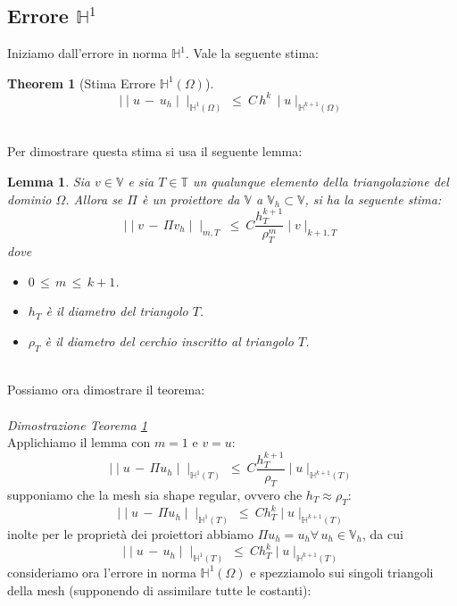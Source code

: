 \documentclass[12pt,a4paper]{report}
\theoremstyle{theorem}
\newtheorem{theorem}{Theorem}[section]
\theoremstyle{theorem}
\newtheorem{lemma}{Lemma}[section]
\theoremstyle{definition}
\begin{document}
\subsection{Errore $\mathbb{H}^{1}$}
Iniziamo dall'errore in norma $\mathbb{H}^{1}$. Vale la seguente stima:
\begin{theorem} [Stima Errore $\mathbb{H}^{1}(\Omega)$] \label{Stima Errore H1} 
\[ \mid \mid u \, - \, u_{h} \mid \mid_{\mathbb{H}^{1}(\Omega)} \ \leq \ C \, h^{k} \, \mid u \mid_{\mathbb{H}^{k+1}(\Omega)} \]
\end{theorem}
\hfill \\
Per dimostrare questa stima si usa il seguente lemma:
\begin{lemma}
Sia $v \in \mathbb{V}$ e sia $T \in \mathbb{T}$ un qualunque elemento della triangolazione del dominio $\Omega$. Allora se $\Pi$ è un proiettore da $\mathbb{V}$ a $\mathbb{V}_{h} \subset \mathbb{V}$, si ha la seguente stima:
\[ \mid \mid v \, - \, \Pi v_{h} \mid \mid_{m,T} \ \leq \ C \frac{h_{T}^{k+1}}{\rho_{T}^{m}} \mid v \mid_{k+1,T}  \]
dove
\begin{itemize}
	\item $ 0 \, \leq \, m \, \leq \, k+1$.
	\item $h_{T}$ è il diametro del triangolo $T$.
	\item $\rho_{T}$ è il diametro del cerchio inscritto al triangolo $T$.
\end{itemize}
\end{lemma}
\hfill \\
Possiamo ora dimostrare il teorema:\\
\hfill \\
\emph{Dimostrazione Teorema \ref{Stima Errore H1}}\\
Applichiamo il lemma con $m = 1$ e $v = u$:
\[ \mid \mid u \, - \, \Pi u_{h} \mid \mid_{\mathbb{H}^{1}(T)} \ \leq \ C \frac{h_{T}^{k+1}}{\rho_{T}} \mid u \mid_{\mathbb{H}^{k+1}(T)} \]
supponiamo che la mesh sia shape regular, ovvero che $h_{T} \approx \rho_{T}$:
\[ \mid \mid u \, - \, \Pi u_{h} \mid \mid_{\mathbb{H}^{1}(T)} \ \leq \ C h_{T}^{k} \mid u \mid_{\mathbb{H}^{k+1}(T)}  \]
inolte per le proprietà dei proiettori abbiamo $ \Pi u_{h} = u_{h} \forall \, u_{h} \in \mathbb{V}_{h}$, da cui
\[ \mid \mid u \, - \, u_{h} \mid \mid_{\mathbb{H}^{1}(T)} \ \leq \ C h_{T}^{k} \mid u \mid_{\mathbb{H}^{k+1}(T)}  \]
consideriamo ora l'errore in norma $\mathbb{H}^1(\Omega)$ e spezziamolo sui singoli triangoli della mesh (supponendo di assimilare tutte le costanti):
\end{document}
